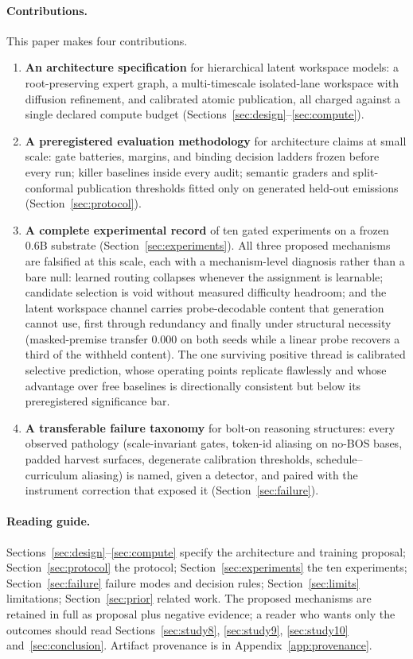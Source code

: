 \documentclass[10pt,a4paper]{article}
\begin{document}
\paragraph{Contributions.}
This paper makes four contributions.
\begin{enumerate}[label=\arabic*.]
\item \textbf{An architecture specification} for hierarchical latent
  workspace models: a root-preserving expert graph, a multi-timescale
  isolated-lane workspace with diffusion refinement, and calibrated
  atomic publication, all charged against a single declared compute budget
  (Sections~\ref{sec:design}--\ref{sec:compute}).
\item \textbf{A preregistered evaluation methodology} for architecture
  claims at small scale: gate batteries, margins, and binding decision
  ladders frozen before every run; killer baselines inside every audit;
  semantic graders and split-conformal publication thresholds fitted only on
  generated held-out emissions (Section~\ref{sec:protocol}).
\item \textbf{A complete experimental record} of ten gated experiments on a
  frozen 0.6B substrate (Section~\ref{sec:experiments}). All three proposed
  mechanisms are falsified at this scale, each with a mechanism-level
  diagnosis rather than a bare null: learned routing collapses whenever the
  assignment is learnable; candidate selection is void without measured
  difficulty headroom; and the latent workspace channel carries
  probe-decodable content that generation cannot use, first through
  redundancy and finally under structural necessity (masked-premise transfer
  0.000 on both seeds while a linear probe recovers a third of the withheld
  content). The one surviving positive thread is calibrated selective
  prediction, whose operating points replicate flawlessly and whose
  advantage over free baselines is directionally consistent but below its
  preregistered significance bar.
\item \textbf{A transferable failure taxonomy} for bolt-on reasoning
  structures: every observed pathology (scale-invariant gates, token-id
  aliasing on no-BOS bases, padded harvest surfaces, degenerate calibration
  thresholds, schedule--curriculum aliasing) is named, given a detector, and
  paired with the instrument correction that exposed it
  (Section~\ref{sec:failure}).
\end{enumerate}

\paragraph{Reading guide.}
Sections~\ref{sec:design}--\ref{sec:compute} specify the architecture and
training proposal; Section~\ref{sec:protocol} the protocol;
Section~\ref{sec:experiments} the ten experiments;
Section~\ref{sec:failure} failure modes and decision rules;
Section~\ref{sec:limits} limitations; Section~\ref{sec:prior} related work.
The proposed mechanisms are retained in full as proposal plus negative
evidence; a reader who wants only the outcomes should read
Sections~\ref{sec:study8}, \ref{sec:study9}, \ref{sec:study10}
and~\ref{sec:conclusion}. Artifact provenance is in
Appendix~\ref{app:provenance}.
\end{document}
